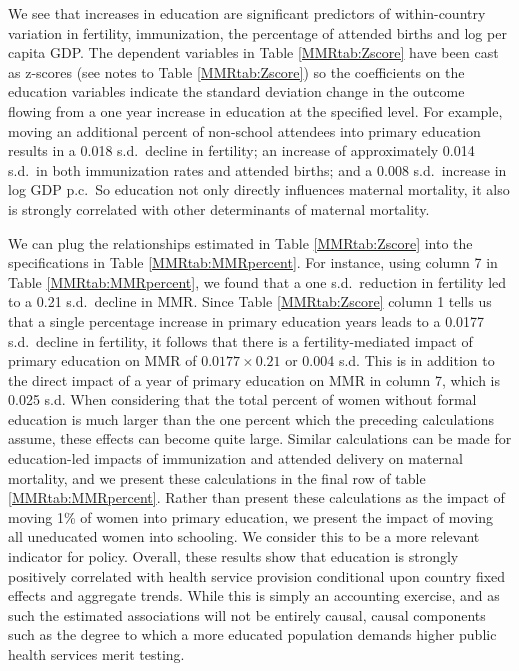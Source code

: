 \documentclass{article}[12pt,subeqn]
\begin{document}
\begin{spacing}{1.4}
We see that increases in education are significant predictors of within-country 
variation in fertility, immunization, the percentage of attended births and log 
per capita GDP. The dependent variables in Table \ref{MMRtab:Zscore} have been 
cast as z-scores (see notes to Table \ref{MMRtab:Zscore}) so the coefficients on 
the education variables indicate the standard deviation change in the outcome 
flowing from a one year increase in education at the specified level. For 
example, moving an additional percent of non-school attendees into primary 
education results in a 0.018 s.d.\ decline in fertility; an increase of 
approximately 0.014 s.d.\ in both immunization rates and attended births; and a 
0.008 s.d.\ increase in log GDP p.c.\ So education not only directly influences 
maternal mortality, it also is strongly correlated with other determinants of 
maternal mortality.

We can plug the relationships estimated in Table \ref{MMRtab:Zscore} into the 
specifications in Table \ref{MMRtab:MMRpercent}. For instance, using column 7 
in Table \ref{MMRtab:MMRpercent}, we found that a one s.d.\ reduction in 
fertility led to a 0.21 s.d.\ decline in MMR. Since Table \ref{MMRtab:Zscore} 
column 1 tells us that a single percentage increase in primary education years 
leads to a 0.0177 s.d.\ decline in fertility, it follows that there is a 
fertility-mediated impact of primary education on MMR of $0.0177\times 0.21$ or 
0.004 s.d. This is in addition to the direct impact of a year of primary 
education on MMR in column 7, which is 0.025 s.d. When considering that the total 
percent of women without formal education is much larger than the one percent 
which the preceding calculations assume, these effects can become quite large. 
Similar calculations can be made for education-led impacts of immunization and 
attended delivery on maternal mortality, and we present these calculations in the 
final row of table \ref{MMRtab:MMRpercent}. Rather than present these 
calculations as the impact of moving 1\% of women into primary education, we 
present the impact of moving all uneducated women into schooling. We consider 
this to be a more relevant indicator for policy. Overall, these results show that 
education is strongly positively correlated with health service provision 
conditional upon country fixed effects and aggregate trends. While this is simply
an accounting exercise, and as such the estimated associations will not be
entirely causal, causal components such as the degree to which a more educated
population demands higher public health services merit testing.


\end{spacing}
\end{document}
